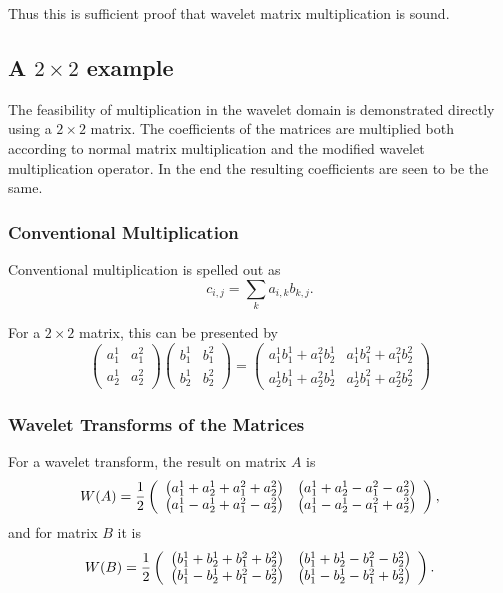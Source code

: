 Thus this is sufficient proof that wavelet matrix multiplication is sound.  


\subsection{A $2\times 2$ example}

The feasibility of multiplication in the wavelet domain is demonstrated directly using a $2 \times 2$ matrix. The coefficients of the matrices are multiplied both according to normal matrix multiplication and the modified wavelet multiplication operator. In the end the resulting coefficients are seen to be the same.

\subsubsection{Conventional Multiplication}
Conventional multiplication is spelled out as
\[
c_{i,j} = \sum\limits_k a_{i,k} b_{k,j}.
\]

For a $2 \times 2$ matrix, this can be presented by
\[
\left(\begin{array}{cc}  a^1_1&  a^2_1 \\ a^1_2 &  a^2_2 \end{array}\right)
\left(\begin{array}{cc}  b^1_1&  b^2_1 \\ b^1_2 &  b^2_2 \end{array}\right) =
\left(\begin{array}{cc}  a^1_{1} b^1_{1} + a^2_{1} b^1_{2}&  a^1_{1}b^2_{1} + a^2_{1}  b^2_{2}    \\ a^1_{2} b^1_{1} + a^2_{2} b^1_{2} &  a^1_{2} b^2_{1} + a^2_{2} b^2_{2} 
\end{array}\right)
\]

\subsubsection{Wavelet Transforms of the Matrices}

For a wavelet transform, the result on matrix $A$ is
\begin{equation} \label{WA} \displaystyle
W(A) = 
{1 \over 2} 
\left(\begin{array}{cc}  
\left(a^1_1 + a^1_2 + a^2_1 + a^2_2\right) & 
\left(a^1_1 + a^1_2 - a^2_1 - a^2_2\right)  \\ 
\left(a^1_1 - a^1_2 + a^2_1 - a^2_2\right) & 
\left(a^1_1 - a^1_2 - a^2_1 + a^2_2\right)   
\end{array}\right), 
\end{equation}
and for matrix $B$ it is
\begin{equation} \label{WB} \displaystyle
W(B) = {1 \over 2} 
\left(\begin{array}{cc}
\left(b^1_1 + b^1_2 + b^2_1 + b^2_2\right) &
\left(b^1_1 + b^1_2 - b^2_1 - b^2_2\right) \\ 
\left(b^1_1 - b^1_2 + b^2_1 - b^2_2\right) &  
\left(b^1_1 - b^1_2 - b^2_1 + b^2_2\right)
\end{array}\right).
\end{equation}

